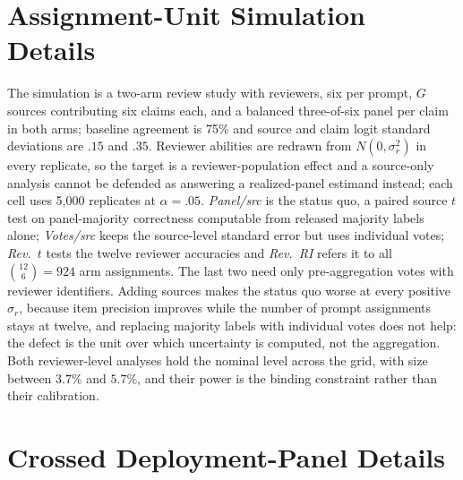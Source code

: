 \documentclass[11pt]{article}
\begin{document}
\FloatBarrier


\FloatBarrier
\section{Assignment-Unit Simulation Details}
\label{sec:appendix-sim}

The simulation is a two-arm review study with \SimReviewers{} reviewers, six per
prompt, $G$ sources contributing six claims each, and a balanced three-of-six
panel per claim in both arms; baseline agreement is 75\% and source and claim
logit standard deviations are $.15$ and $.35$. Reviewer abilities are redrawn
from $N(0,\sigma_r^2)$ in every replicate, so the target is a
reviewer-population effect and a source-only analysis cannot be defended as
answering a realized-panel estimand instead; each cell uses 5{,}000 replicates
at $\alpha=.05$. \emph{Panel/src} is the status quo, a paired source $t$ test on
panel-majority correctness computable from released majority labels alone;
\emph{Votes/src} keeps the source-level standard error but uses individual
votes; \emph{Rev.\ $t$} tests the twelve reviewer accuracies and \emph{Rev.\ RI}
refers it to all $\binom{12}{6}=924$ arm assignments. The last two need only
pre-aggregation votes with reviewer identifiers. Adding sources makes the status
quo worse at every positive $\sigma_r$, because item precision improves while
the number of prompt assignments stays at twelve, and replacing majority labels
with individual votes does not help: the defect is the unit over which
uncertainty is computed, not the aggregation. Both reviewer-level analyses hold
the nominal level across the grid, with size between $3.7\%$ and $5.7\%$, and
their power is the binding constraint rather than their calibration.









\FloatBarrier
\section{Crossed Deployment-Panel Details}
\label{sec:appendix-cmj}



\FloatBarrier
\end{document}

